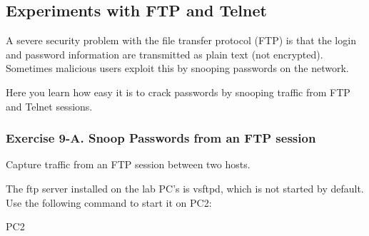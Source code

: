 \begin{questions}
\end{questions}

\newpage
\subsection{Experiments with FTP and Telnet}

A severe security problem with the file transfer protocol (FTP) is that the login and password information are transmitted as plain text (not encrypted). Sometimes malicious users exploit this by snooping passwords on the network.

Here you learn how easy it is to crack passwords by snooping traffic from FTP and Telnet sessions.


\subsubsection*{Exercise 9-A. Snoop Passwords from an FTP session}

Capture traffic from an FTP session between two hosts.

The ftp server installed on the lab PC's is vsftpd, which is not started by default. Use the following command to start it on PC2:

\begin{cmdblock}
	PC2%
\end{cmdblock}

